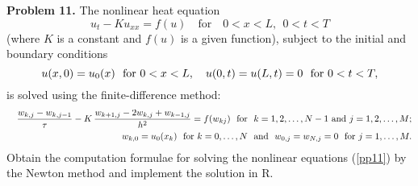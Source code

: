 \documentclass[10pt]{article}
\begin{document}

\vskip 0.5cm \noindent
{\bf Problem 11.}
The nonlinear heat equation
\[
u_t -K u_{xx}=f(u) \quad \textrm{for} \quad 0 < x < L, \ \ 0 < t < T
\]
(where $K$ is a constant and $f(u)$ is a given function), subject to the initial and boundary conditions
\[
u(x,0)=u_0(x) \ \ \hbox{for} \ 0 < x < L, \quad u(0,t)=u(L,t)=0  \ \ \hbox{for} \ 0 < t < T,
\]
is solved using the finite-difference method:
\begin{eqnarray}
&&\frac{w_{k,j}-w_{k,j-1}}{\tau}-
K \, \frac{w_{k+1,j}-2w_{k,j}+w_{k-1,j}}{h^{2}}=f(w_{kj}) \ \ \hbox{for} \ \ k=1,2,\dots,N-1 \  \hbox{and} \ j=1,2,\dots,M; \label{pp11} \\
&&w_{k,0}=u_0(x_{k}) \ \ \hbox{for} \ k=0, \dots,N \ \ \hbox{and} \ \ w_{0,j}=w_{N,j}=0 \ \ \hbox{for} \ j=1, \dots,M . \label{pp22}
\end{eqnarray}
Obtain the computation formulae for solving the nonlinear equations (\ref{pp11}) by the Newton method and implement the solution in R.
\end{document}
